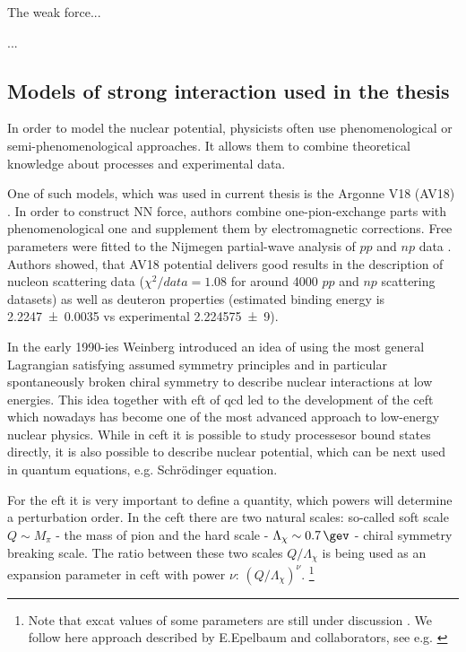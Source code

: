 The weak force...

...  

\subsection*{Models of strong interaction used in the thesis}

In order to model the nuclear potential, physicists often use phenomenological
or semi-phenomenological approaches. It allows them to combine
theoretical knowledge about processes and experimental data.

One of such models, which was used in current thesis is the Argonne V18 (AV18) \cite{AV18Wiringa}.
In order to construct NN force, authors combine
one-pion-exchange parts
with phenomenological one and supplement them by electromagnetic corrections.
Free parameters were fitted to
the Nijmegen partial-wave analysis of $pp$ and $np$ data \cite{NijmegenPhysRevC.48.792}. 
Authors showed, that AV18 potential delivers good results
in the description of nucleon scattering data ($\chi ^2/data = 1.08$ for around \num{4000} $pp$ and $np$ scattering datasets) 
as well as deuteron properties (estimated binding energy is \SI{2.2247(35)}{\mev} vs experimental \SI{ 2.224 575(9)}{\mev}).


In the early 1990-ies Weinberg \cite{WEINBERG1990,WEINBERG1991} introduced 
an idea of using the most general Lagrangian
satisfying assumed symmetry principles and in particular
spontaneously broken chiral symmetry to 
describe nuclear interactions at low energies.
This idea together with \gls{eft} of \gls{qcd} 
led to the development of the \gls{ceft}
which nowadays has become one of the most advanced approach to
low-energy nuclear physics. While in \gls{ceft} it is possible to study processesor bound states directly,
it is also possible to describe nuclear potential, which can be next used in quantum equations,
e.g. Schr\"odinger equation.
 
For the \gls{eft} it is very important to 
define a quantity, which powers will determine a perturbation order.
In the \gls{ceft} there are two natural scales: so-called soft scale $Q \sim M_\pi$  -
the mass of pion and the hard scale -
$\Lambda_\chi \sim \SI{0.7}{\gev}$ - chiral symmetry breaking scale.
The ratio between these two scales $Q/\Lambda_\chi$
is being used as an expansion parameter in  \gls{ceft} with power
$\nu$: $\left(Q/\Lambda_\chi\right)^\nu$.
\footnote{Note that excat values of some parameters are still under discussion \cite{Epelbaum2004}. We follow here approach described by E.Epelbaum and collaborators, see e.g. \cite{reinkrebs2018}}


